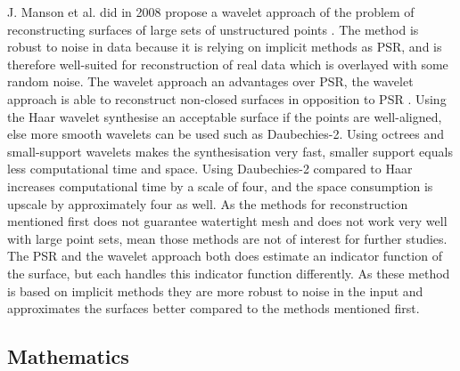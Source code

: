 J. Manson et al. did in 2008 propose a wavelet approach of the problem of reconstructing surfaces of large sets of unstructured points \cite{Manson2008}. The method is robust to noise in data because it is relying on implicit methods as PSR, and is therefore well-suited for reconstruction of real data which is overlayed with some random noise. The wavelet approach an advantages over PSR, the wavelet approach is able to reconstruct non-closed surfaces in opposition to PSR \cite{Kazhdan2006}. Using the Haar wavelet synthesise an acceptable surface if the points are well-aligned, else more smooth wavelets can be used such as Daubechies-2. Using octrees and small-support wavelets makes the synthesisation very fast, smaller support equals less computational time and space. Using Daubechies-2 compared to Haar increases computational time by a scale of four, and the space consumption is upscale by approximately four as well. As the methods for reconstruction mentioned first does not guarantee watertight mesh and does not work very well with large point sets, mean those methods are not of interest for further studies. The PSR and the wavelet approach both does estimate an indicator function of the surface, but each handles this indicator function differently. As these method is based on implicit methods they are more robust to noise in the input and approximates the surfaces better compared to the methods mentioned first.

\subsection{Mathematics}

